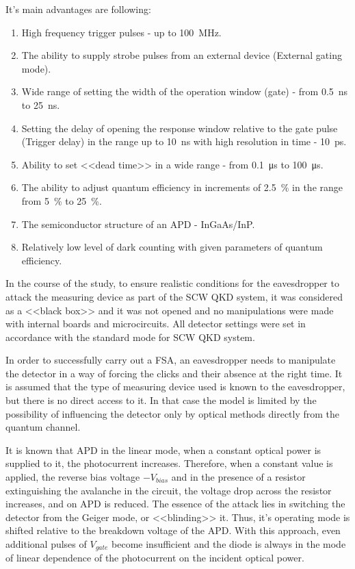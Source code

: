 It's main advantages are following:
\begin{enumerate}
	\item High frequency trigger pulses - up to 100~MHz.
	\item The ability to supply strobe pulses from an external device (External gating mode).
	\item Wide range of setting the width of the operation window (gate) - from 0.5~ns to 25~ns.
	\item Setting the delay of opening the response window relative to the gate pulse (Trigger delay) in the range up to 10~ns with high resolution in time - 10~ps.
	\item Ability to set <<dead time>> in a wide range - from 0.1~μs to 100~μs.
	\item The ability to adjust quantum efficiency in increments of 2.5~\% in the range from 5~\% to 25~\%.
	\item The semiconductor structure of an APD - InGaAs/InP.
	\item Relatively low level of dark counting with given parameters of quantum efficiency.
\end{enumerate}

In the course of the study, to ensure realistic conditions for the eavesdropper to attack the measuring device as part of the SCW QKD system, it was considered as a <<black box>> and it was not opened and no manipulations were made with internal boards and microcircuits. All detector settings were set in accordance with the standard mode for SCW QKD system.

In order to successfully carry out a FSA, an eavesdropper needs to manipulate the detector
 in a way of forcing the clicks and their absence at the right time. It is assumed that the type of measuring device used is known to the eavesdropper, but there is no direct access to it. In that case the model is limited by the possibility of influencing the detector only by optical methods directly from the quantum channel.

It is known that APD in the linear mode, when a constant optical power is supplied to it, the photocurrent increases. Therefore, when a constant value is applied, the reverse bias voltage $-V_{bias}$ and in the presence of a resistor extinguishing the avalanche in the circuit, the voltage drop across the resistor increases, and on APD is reduced. The essence of the attack lies in switching the detector from the Geiger mode, or <<blinding>> it. Thus, it's operating mode is shifted relative to the breakdown voltage of the APD. With this approach, even additional pulses of $V_{gate}$ become insufficient and the diode is always in the mode of linear dependence of the photocurrent on the incident optical power.  

